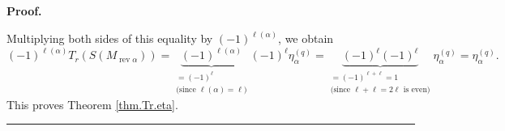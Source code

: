 \documentclass[numbers=enddot,12pt,final,onecolumn,notitlepage]{scrartcl}%
\theoremstyle{definition}
\newenvironment{proof}[1][Proof]{\noindent\textbf{#1.} }{\ \rule{0.5em}{0.5em}}
\newenvironment{verlong}{}{}
\begin{document}
\begin{proof}
\begin{verlong}
\end{verlong}

\noindent Multiplying both sides of this equality by $\left(  -1\right)
^{\ell\left(  \alpha\right)  }$, we obtain%
\[
\left(  -1\right)  ^{\ell\left(  \alpha\right)  }T_{r}\left(  S\left(
M_{\operatorname*{rev}\alpha}\right)  \right)  =\underbrace{\left(  -1\right)
^{\ell\left(  \alpha\right)  }}_{\substack{=\left(  -1\right)  ^{\ell
}\\\text{(since }\ell\left(  \alpha\right)  =\ell\text{)}}}\left(  -1\right)
^{\ell}\eta_{\alpha}^{\left(  q\right)  }=\underbrace{\left(  -1\right)
^{\ell}\left(  -1\right)  ^{\ell}}_{\substack{=\left(  -1\right)  ^{\ell+\ell
}=1\\\text{(since }\ell+\ell=2\ell\text{ is even)}}}\eta_{\alpha}^{\left(
q\right)  }=\eta_{\alpha}^{\left(  q\right)  }.
\]
This proves Theorem \ref{thm.Tr.eta}.
\end{proof}
\end{document}
